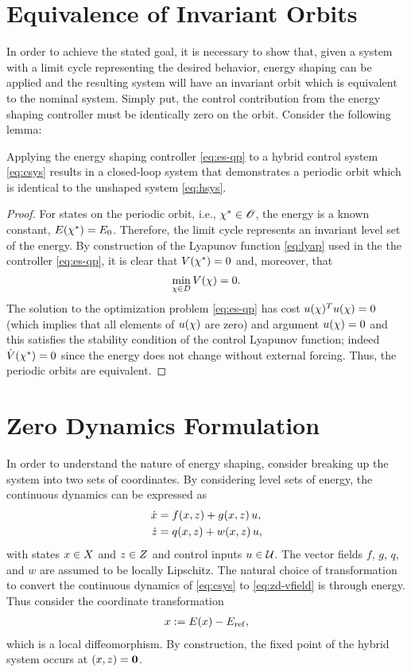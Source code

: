 \documentclass[twocolumn]{article}
\begin{document}
\section{Equivalence of Invariant Orbits}

In order to achieve the stated goal, it is necessary to show that, given a system with a limit cycle representing the desired behavior, energy shaping can be applied and the resulting system will have an invariant orbit which is equivalent to the nominal system. Simply put, the control contribution from the energy shaping controller must be identically zero on the orbit. Consider the following lemma:

\begin{lemma}
  Applying the energy shaping controller \eqref{eq:es-qp} to a hybrid control system \eqref{eq:csys} results in a closed-loop system that demonstrates a periodic orbit which is identical to the unshaped system \eqref{eq:hsys}.
\end{lemma}

\begin{proof}
  For states on the periodic orbit, i.e., $\chi^{*} \in \mathscr{O}$, the energy is a known constant, $E(\chi^{*}) = E_{0}$.
  Therefore, the limit cycle represents an invariant level set of the energy.
  By construction of the Lyapunov function \eqref{eq:lyap} used in the the controller \eqref{eq:es-qp}, it is clear that $V(\chi^{*}) = 0$ and, moreover, that $$\min_{\chi \in D} V(\chi) = 0.$$
  The solution to the optimization problem \eqref{eq:es-qp} has cost $u(\chi)^T u(\chi) = 0$ (which implies that all elements of $u(\chi)$ are zero) and argument $u(\chi) = 0$ and this satisfies the stability condition of the control Lyapunov function; indeed ${\dot V}(\chi^{*}) = 0$ since the energy does not change without external forcing.
  Thus, the periodic orbits are equivalent.
\end{proof}

\section{Zero Dynamics Formulation}

In order to understand the nature of energy shaping, consider breaking up the system into two sets of coordinates.
%
By considering level sets of energy, the continuous dynamics can be expressed as
\begin{align}
  \nonumber
  \dot {x} &= f(x, z) + g(x, z) \, u,\\
  \dot {z} &= q(x, z) + w(x, z) \, u,
  \label{eq:zd-vfield}
\end{align}
%
with states $x \in X$ and $z \in Z$ and control inputs $u \in \mathcal{U}$.
%
The vector fields $f$, $g$, $q$, and $w$ are assumed to be locally Lipschitz.
%
The natural choice of transformation to convert the continuous dynamics of \eqref{eq:csys} to \eqref{eq:zd-vfield} is through energy.
%
Thus consider the coordinate transformation
\begin{align}
  x := E(x) - E_{\mathrm{ref}},
\end{align}
which is a local diffeomorphism.
%
By construction, the fixed point of the hybrid system occurs at $(x, z) = \mathbf{0}$.
%
\end{document}
